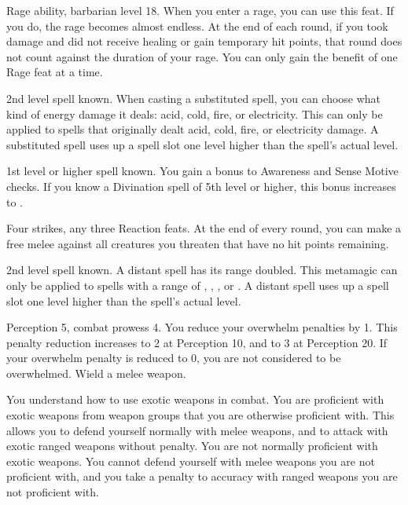 \featpre Rage ability, barbarian level 18.
\featben When you enter a rage, you can use this feat. If you do, the rage becomes almost endless. At the end of each round, if you took damage and did not receive healing or gain temporary hit points, that round does not count against the duration of your rage.
 You can only gain the benefit of one Rage feat at a time.

\featpre 2nd level spell known.
\featben When casting a substituted spell, you can choose what kind of energy damage it deals: acid, cold, fire, or electricity.
This can only be applied to spells that originally dealt acid, cold, fire, or electricity damage.
A substituted spell uses up a spell slot one level higher than the spell's actual level.

\featpre 1st level or higher  spell known.
\featben You gain a  bonus to Awareness and Sense Motive checks.
If you know a Divination spell of 5th level or higher, this bonus increases to .

\featpres Four strikes, any three Reaction feats.
\featben At the end of every round, you can make a free melee  against all creatures you threaten that have no hit points remaining.

\featpre 2nd level spell known.
\featben A distant spell has its range doubled.
This metamagic can only be applied to spells with a range of \rngclose, \rngmed, \rnglong, or \rngext.
A distant spell uses up a spell slot one level higher than the spell's actual level.

\featpre Perception 5, combat prowess 4.
\featben You reduce your overwhelm penalties by 1.
This penalty reduction increases to 2 at Perception 10, and to 3 at Perception 20.
If your overwhelm penalty is reduced to 0, you are not considered to be overwhelmed.
\featpre Wield a melee weapon.

You understand how to use exotic weapons in combat.
\featben You are proficient with exotic weapons from weapon groups that you are otherwise proficient with.
This allows you to defend yourself normally with melee weapons, and to attack with exotic ranged weapons without penalty.
You are not normally proficient with exotic weapons.
You cannot defend yourself with melee weapons you are not proficient with, and you take a  penalty to accuracy with ranged weapons you are not proficient with.

